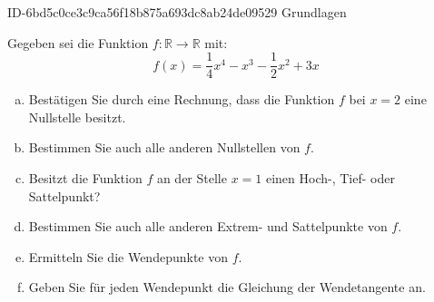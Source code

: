 \begin{exercise}
      {ID-6bd5c0ce3c9ca56f18b875a693dc8ab24de09529}
      {Grundlagen}
  \ifproblem\problem\par
    Gegeben sei die Funktion $f:\mathbb{R}\to\mathbb{R}$ mit:
    \begin{equation*}
      f(x)=\frac{\num{1}}{\num{4}}x^{4}-x^{3}-\frac{\num{1}}{\num{2}}x^{2}+\num{3}x
    \end{equation*}
    \begin{enumerate}[a)]
      \item Bestätigen Sie durch eine Rechnung, dass die
            Funktion $f$ bei $x=2$ eine Nullstelle besitzt.
      \item Bestimmen Sie auch alle anderen Nullstellen von $f$.
      \item Besitzt die Funktion $f$ an der Stelle $x=1$
            einen Hoch-, Tief- oder Sattelpunkt?
      \item Bestimmen Sie auch alle anderen Extrem- und
            Sattelpunkte von $f$.
      \item Ermitteln Sie die Wendepunkte von $f$.
      \item Geben Sie für jeden Wendepunkt die Gleichung
            der Wendetangente an.
    \end{enumerate}
  \fi
\end{exercise}
